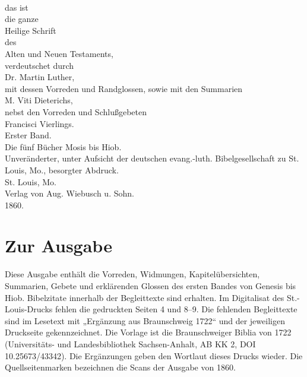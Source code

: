\documentclass{oll-book}
\begin{document}
\frontmatter
\begin{titelseite}
\\[1em]
das ist\\[0.5em]
die ganze\\[0.5em]
Heilige Schrift\\[0.5em]
des\\[0.5em]
Alten und Neuen Testaments,\\[1em]
verdeutschet durch\\[0.5em]
Dr. Martin Luther,\\[1em]
mit dessen Vorreden und Randglossen, sowie mit den Summarien\\[0.5em]
M. Viti Dieterichs,\\[0.5em]
nebst den Vorreden und Schlußgebeten\\[0.5em]
Francisci Vierlings.\\[1em]
Erster Band.\\[0.5em]
Die fünf Bücher Mosis bis Hiob.\\[1em]
Unveränderter, unter Aufsicht der deutschen evang.-luth. Bibelgesellschaft zu St. Louis, Mo., besorgter Abdruck.\\[1em]
St. Louis, Mo.\\[0.5em]
Verlag von Aug. Wiebusch u. Sohn.\\[0.5em]
1860.
\end{titelseite}
\chapter{Zur Ausgabe}
Diese Ausgabe enthält die Vorreden, Widmungen, Kapitelübersichten,
Summarien, Gebete und erklärenden Glossen des ersten Bandes von Genesis
bis Hiob. Bibelzitate innerhalb der Begleittexte sind erhalten.
Im Digitalisat des St.-Louis-Drucks fehlen die gedruckten Seiten 4 und 8–9.
Die fehlenden Begleittexte sind im Lesetext mit „Ergänzung aus Braunschweig 1722“
und der jeweiligen Druckseite gekennzeichnet. Die Vorlage ist die
Braunschweiger Biblia von 1722 (Universitäts- und Landesbibliothek
Sachsen-Anhalt, AB KK 2, DOI 10.25673/43342).
Die Ergänzungen geben den Wortlaut dieses Drucks wieder. Die Quellseitenmarken
bezeichnen die Scans der Ausgabe von 1860.
\tableofcontents
\mainmatter

\end{document}

